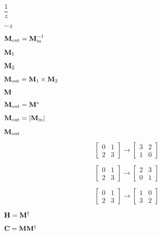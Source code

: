 \documentclass{article}
\begin{document}
$\dfrac{1}{z}$
\pagebreak

$-z$
\pagebreak

${\bf M}_\text{out} = {\bf M}_\text{in}^{-1}$
\pagebreak

${\bf M}_1$
\pagebreak

${\bf M}_2$
\pagebreak

${\bf M}_\text{out} = {\bf M}_1 \times {\bf M}_2$
\pagebreak

${\bf M}$
\pagebreak

${\bf M}_\text{out} = {\bf M}^\ast$
\pagebreak

${\bf M}_\text{out} = |{\bf M}_\text{in}|$
\pagebreak

${\bf M}_\text{out}$
\pagebreak

\[\begin{bmatrix} 0 & 1 \\ 2 & 3\end{bmatrix} \rightarrow \begin{bmatrix} 3 & 2 \\ 1 & 0 \end{bmatrix}\]
\pagebreak

\[\begin{bmatrix} 0 & 1 \\ 2 & 3\end{bmatrix} \rightarrow \begin{bmatrix} 2 & 3 \\ 0 & 1 \end{bmatrix}\]
\pagebreak

\[\begin{bmatrix} 0 & 1 \\ 2 & 3\end{bmatrix} \rightarrow \begin{bmatrix} 1 & 0 \\ 3 & 2 \end{bmatrix}\]
\pagebreak

${\bf H} = {\bf M}^\dagger$
\pagebreak

${\bf C} = {\bf M}{\bf M}^\dagger$
\pagebreak
\end{document}
